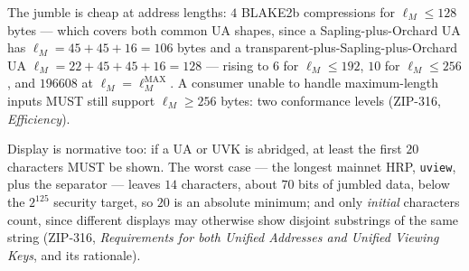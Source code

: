 \documentclass[11pt,a4paper]{article}
\theoremstyle{definition}
\begin{document}
The jumble is cheap at address lengths: $4$ BLAKE2b compressions for
$\ell_M \le 128$ bytes --- which covers both common UA shapes, since a
Sapling-plus-Orchard UA has $\ell_M = 45 + 45 + 16 = 106$ bytes and a
transparent-plus-Sapling-plus-Orchard UA $\ell_M = 22 + 45 + 45 + 16 =
128$ --- rising to $6$ for $\ell_M \le 192$, $10$ for $\ell_M \le 256$,
and $196608$ at $\ell_M = \ell^{\mathrm{MAX}}_M$. A consumer unable to
handle maximum-length inputs MUST still support $\ell_M \ge 256$ bytes:
two conformance levels (ZIP-316, \emph{Efficiency}).

Display is normative too: if a UA or UVK is abridged, at least the first
$20$ characters MUST be shown. The worst case --- the longest mainnet HRP,
\texttt{uview}, plus the separator --- leaves $14$ characters, about $70$
bits of jumbled data, below the $2^{125}$ security target, so $20$ is an
absolute minimum; and only \emph{initial} characters count, since
different displays may otherwise show disjoint substrings of the same
string (ZIP-316, \emph{Requirements for both Unified Addresses and Unified
Viewing Keys}, and its rationale).
\end{document}
